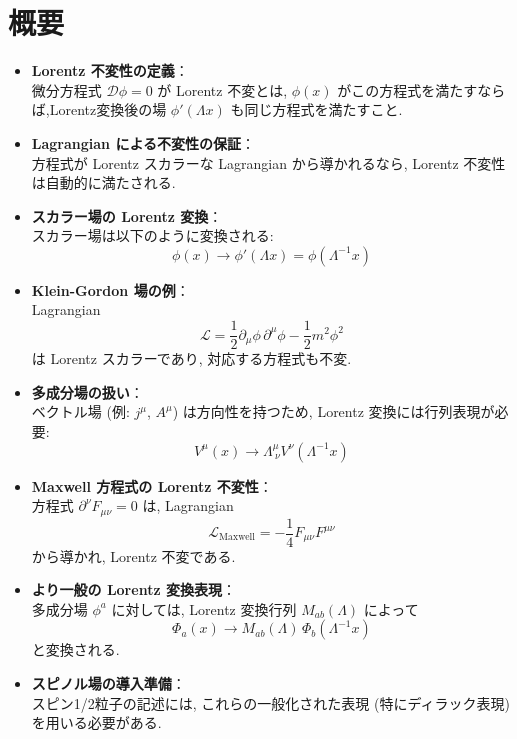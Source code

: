 \documentclass[a4paper,12pt]{article}
\begin{document}
\section*{概要}
\begin{itemize}
  \item \textbf{Lorentz 不変性の定義}：\\
  微分方程式 $\mathcal{D}\phi = 0$ が Lorentz 不変とは, $\phi(x)$ がこの方程式を満たすならば,Lorentz変換後の場 $\phi'(\Lambda x)$ も同じ方程式を満たすこと.

  \item \textbf{ Lagrangian による不変性の保証}：\\
  方程式が Lorentz スカラーな Lagrangian から導かれるなら, Lorentz 不変性は自動的に満たされる.

  \item \textbf{スカラー場の Lorentz 変換}：\\
  スカラー場は以下のように変換される:
  \begin{equation*}
    \phi(x) \to \phi'(\Lambda x) = \phi(\Lambda^{-1}x)
  \end{equation*}

  \item \textbf{Klein-Gordon 場の例}：\\
  Lagrangian
  \begin{equation*}
    \mathcal{L} = \frac{1}{2} \partial_\mu \phi\, \partial^\mu \phi - \frac{1}{2} m^2 \phi^2
  \end{equation*}
  は Lorentz スカラーであり, 対応する方程式も不変.

  \item \textbf{多成分場の扱い}：\\
  ベクトル場 (例: $j^\mu$, $A^\mu$) は方向性を持つため, Lorentz 変換には行列表現が必要:
  \begin{equation*}
    V^\mu(x) \to \Lambda^\mu_{\ \nu} V^\nu(\Lambda^{-1}x)
  \end{equation*}

  \item \textbf{Maxwell 方程式の Lorentz 不変性}：\\
  方程式 $\partial^\nu F_{\mu\nu} = 0$ は, Lagrangian
  \begin{equation*}
    \mathcal{L}_\text{Maxwell} = -\frac{1}{4} F_{\mu\nu} F^{\mu\nu}
  \end{equation*}
  から導かれ, Lorentz 不変である.

  \item \textbf{より一般の Lorentz 変換表現}：\\
  多成分場 $\phi^a$ に対しては, Lorentz 変換行列 $M_{ab}(\Lambda)$ によって
  \begin{equation*}
    \Phi_a(x) \to M_{ab}(\Lambda)\, \Phi_b(\Lambda^{-1}x)
  \end{equation*}
  と変換される.

  \item \textbf{スピノル場の導入準備}：\\
  スピン1/2粒子の記述には, これらの一般化された表現 (特にディラック表現) を用いる必要がある.
\end{itemize}
\newpage
\color{black}
\end{document}
